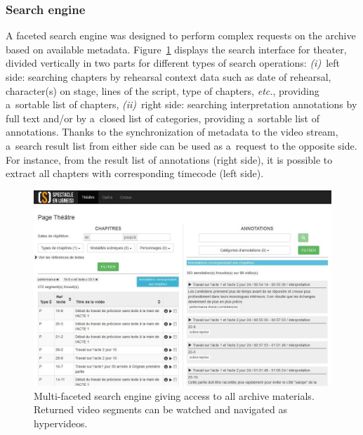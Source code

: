 \documentclass[conference]{IEEEtran}
\newcommand{\todo}[1]{\noindent\textcolor{red}{{\bf \{ToDo} #1{\bf \}}}}
\begin{document}
\subsubsection{Search engine}
A faceted search engine was designed to perform complex requests on the archive based on available metadata.
Figure~\ref{fig:searchengine} displays the search interface for theater, divided vertically in two parts for different types of search operations:
\emph{(i)}~left side: searching chapters by rehearsal context data such as date of rehearsal, character(s) on stage, lines of the script, type of chapters, \emph{etc.}, providing a~sortable list of chapters,
\emph{(ii)}~right side: searching interpretation annotations by full text and/or by a~closed list of categories, providing a~sortable list of annotations. Thanks to the synchronization of metadata to the video stream, a~search result list from either side can be used as a~request to the opposite side. For instance, from the result list of annotations (right side), it is possible to extract all chapters with corresponding timecode (left side).

\begin{figure}[htb!]
  \centering
  \includegraphics[width=\columnwidth]{searchengine}
  \caption{Multi-faceted search engine giving access to all archive materials. 
  Returned video segments can be watched and navigated as hypervideos.}  %
  \label{fig:searchengine}
\end{figure}


\end{document}

